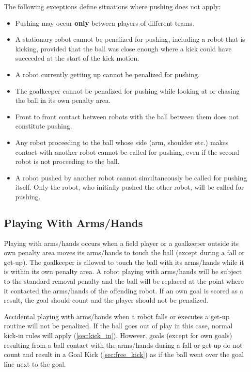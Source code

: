 The following exceptions define situations where pushing does not apply:
\begin{itemize}
  \item Pushing may occur \textbf{only} between players of different teams.
  \item A stationary robot cannot be penalized for pushing, including a robot that is kicking, provided that the ball was close enough where a kick could have succeeded at the start of the kick motion.
  \item A robot currently getting up cannot be penalized for pushing.
  \item The goalkeeper cannot be penalized for pushing while looking at or chasing the ball in its own penalty area.
  \item Front to front contact between robots with the ball between them does not constitute pushing.
  \item Any robot proceeding to the ball whose side (\ie arm, shoulder etc.) makes contact with another robot cannot be called for pushing, even if the second robot is not proceeding to the ball.
  \item A robot pushed by another robot cannot simultaneously be called for pushing itself.
    Only the robot, who initially pushed the other robot, will be called for pushing.
\end{itemize}

\subsection{Playing With Arms/Hands}
\label{sec:hand_ball}

Playing with arms/hands occurs when a field player or a goalkeeper outside its own penalty area moves its arms/hands to touch the ball (except during a fall or get-up).
The goalkeeper is allowed to touch the ball with its arms/hands while it is within its own penalty area.
A robot playing with arms/hands will be subject to the standard removal penalty and the ball will be replaced at the point where it contacted the arms/hands of the offending robot.
If an own goal is scored as a result, the goal should count and the player should not be penalized.

Accidental playing with arms/hands when a robot falls or executes a get-up routine will not be penalized.
If the ball goes out of play in this case, normal kick-in rules will apply (\cf \cref{sec:kick_in}).
However, goals (except for own goals) resulting from a ball contact with the arms/hands during a fall or get-up do not count and result in a Goal Kick (\cf \cref{sec:free_kick}) as if the ball went over the goal line next to the goal.

